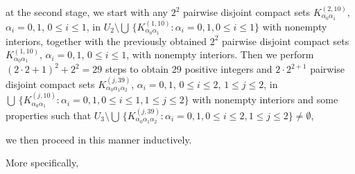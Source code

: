 \documentclass[12pt]{article}
\newcommand{\al}{\alpha}
\begin{document}
at the second stage, we start with any $2^2$ pairwise disjoint compact sets $K_{\al_0\al_1}^{(2,10)}$, $\al_i = 0, 1$, $0 \le i \le 1$, in $U_2 \setminus \bigcup \, \{ K_{\al_0\al_1}^{(1,10)}: \al_i = 0, 1, 0 \le i \le 1 \}$ with nonempty interiors, together with the previously obtained $2^2$ pairwise disjoint compact sets $K_{\al_0\al_1}^{(1,10)}$, $\al_i = 0, 1$, $0 \le i \le 1$, with nonempty interiors.  Then we perform $(2 \cdot 2 +1)^2 + 2^2 = 29$ steps to obtain 29 positive integers and $2 \cdot 2^{2+1}$ pairwise disjoint compact sets $K_{\al_0\al_1\al_2}^{(j,39)}$, $\al_i = 0, 1$, $0 \le i \le 2$, $1 \le j \le 2$, in $\bigcup \, \{ K_{\al_0\al_1}^{(j,10)}: \al_i = 0,1, 0 \le i \le 1, 1 \le j \le 2 \}$ with nonempty interiors and some properties such that $U_3 \setminus \bigcup \, \{ K_{\al_0\al_1\al_2}^{(j,39)}: \al_i = 0, 1, 0 \le i \le 2, 1 \le j \le 2 \} \ne \emptyset$,

we then proceed in this manner inductively.  

More specifically, 
\end{document}
